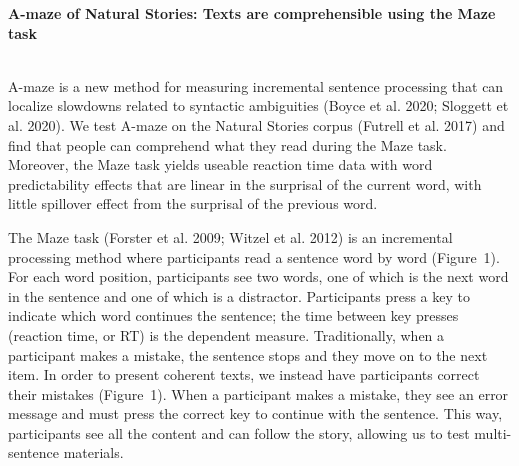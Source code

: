 \documentclass[11pt,a4paper]{article}
\renewcommand{\title}[1]{\textbf{#1}\\}
\newcommand{\authors}[1]{\iftoggle{anonymous}{\phantom{#1}}{#1}\\}
\newcommand{\email}[1]{\iftoggle{anonymous}{\phantom{#1}}{#1}}
\begin{document}


\title{A-maze of Natural Stories: Texts are comprehensible using the Maze task}
\authors{Veronica Boyce (MIT/Stanford), Roger Levy (MIT)} %
\email{vboyce@stanford.edu}
\newline
%

A-maze is a new method for measuring incremental sentence processing that can localize slowdowns related to syntactic ambiguities (Boyce et al. 2020; Sloggett et al. 2020). We test A-maze on the Natural Stories corpus (Futrell et al. 2017) and find that people can comprehend what they read during the Maze task. Moreover, the Maze task yields useable reaction time data with word predictability effects that are linear in the surprisal of the current word, with little spillover effect from the surprisal of the previous word. 

The Maze task (Forster et al. 2009; Witzel et al. 2012) is an incremental processing method where participants read a sentence word by word  (Figure~1). For each word position, participants see two words, one of which is the next word in the sentence and one of which is a distractor. Participants press a key to indicate which word continues the sentence; the time between key presses (reaction time, or RT) is the dependent measure.  Traditionally, when a participant makes a mistake, the sentence stops and they move on to the next item. In order to present coherent texts, we instead have participants correct their mistakes (Figure~1). When a participant makes a mistake, they see an error message and must press the correct key to continue with the sentence. This way, participants see all the content and can follow the story, allowing us to test multi-sentence materials.
\end{document}
